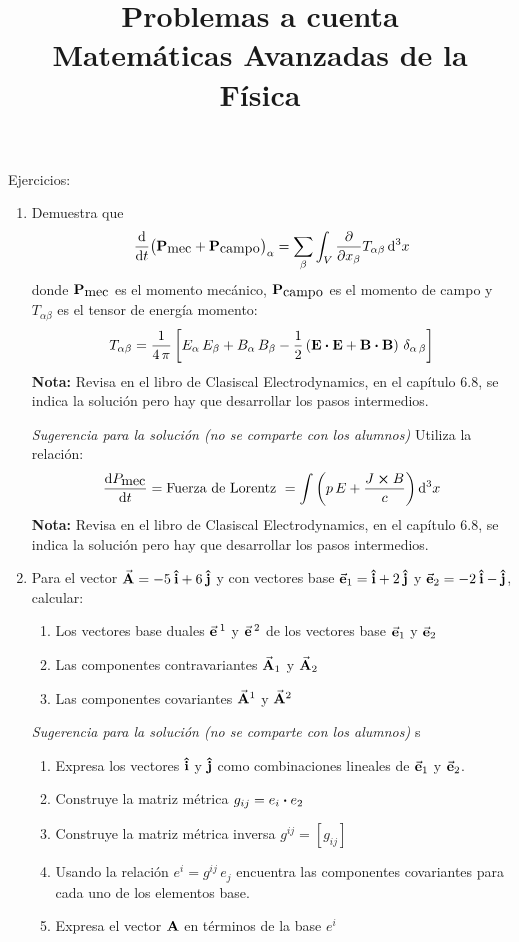 \documentclass[12pt]{article}
\title{Problemas a cuenta \\ {\large Matemáticas Avanzadas de la Física}}
\date{ }
\begin{document}
\renewcommand\labelenumii{\theenumi.{\arabic{enumii}}}
\maketitle
\fontsize{14}{14}\selectfont
Ejercicios:
\begin{enumerate}
\item Demuestra que 
\begin{align*}
\dv{t} (\vb{P}_{\mbox{mec}} + \vb{P}_{\mbox{campo}})_{\alpha} = \sum_{\beta} \int_{V} \pdv{x_{\beta}} T_{\alpha \beta} \dd[3]{x}
\end{align*}
donde $\vb{P}_{\mbox{mec}}$ es el momento mecánico,  $\vb{P}_{\mbox{campo}}$ es el momento de campo y $T_{\alpha \beta}$ es el tensor de energía momento:
\begin{align*}
T_{\alpha \beta} = \dfrac{1}{4 \, \pi} \left[ E_{\alpha} \, E_{\beta} + B_{\alpha} \, B_{\beta} - \dfrac{1}{2} \left( \vb{E} \vdot \vb{E} + \vb{B} \vdot \vb{B} \right)  \, \delta_{\alpha \, \beta} \right]
\end{align*}
\textbf{Nota: } Revisa en el libro de Clasiscal Electrodynamics, en el capítulo 6.8, se indica la solución pero hay que desarrollar los pasos intermedios.
\par
\textit{Sugerencia para la solución (no se comparte con los alumnos)} Utiliza la relación:
\begin{align*}
\dv{P_{\mbox{mec}}}{t} = \mbox{Fuerza de Lorentz } = \int \left( p \, E + \dfrac{J \cp B}{c} \right) \dd[3]{x}
\end{align*}
\textbf{Nota: } Revisa en el libro de Clasiscal Electrodynamics, en el capítulo 6.8, se indica la solución pero hay que desarrollar los pasos intermedios.
\item Para el vector $\va{A} = - 5 \: \vu{i} + 6 \: \vu{j}$ y con vectores base $\va{e}_{1} = \vu{i} +  2 \: \vu{j}$ y $\va{e}_{2} = - 2 \: \vu{i} - \vu{j}$, calcular:
\begin{enumerate}
\item Los vectores base duales $\va{e}^{\: 1}$ y $\va{e}^{\: 2}$ de los vectores base $\va{e}_{1}$ y $\va{e}_{2}$
\item Las componentes contravariantes $\va{A}_{1}$ y $\va{A}_{2}$
\item Las componentes covariantes $\va{A}^{1}$ y $\va{A}^{2}$
\end{enumerate}
\textit{Sugerencia para la solución (no se comparte con los alumnos)}
s\begin{enumerate}[label=\alph*)]
\item Expresa los vectores $\vu{i}$ y $\vu{j}$ como combinaciones lineales de $\va{e}_{1}$ y $\va{e}_{2}$.
\item Construye la matriz métrica $g_{ij} = e_{i} \vdot e_{2}$
\item Construye la matriz métrica inversa $g^{ij} = [g_{ij}]$
\item Usando la relación $e^{i} = g^{ij} \, e_{j}$ encuentra las componentes covariantes para cada uno de los elementos base.
\item Expresa el vector $\vb{A}$ en términos de la base $e^{i}$
\end{enumerate}
\end{enumerate}
\end{document}
